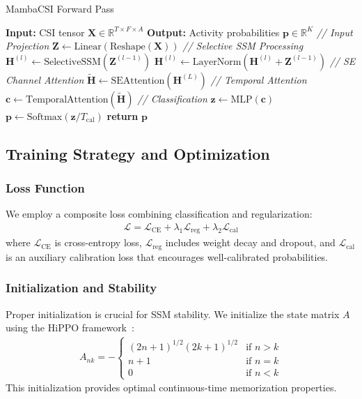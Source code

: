 \documentclass[journal]{IEEEtran}
\begin{document}
\begin{algorithm}
\caption{MambaCSI Forward Pass}
\label{alg:mambacsi}
\begin{algorithmic}[1]
\STATE \textbf{Input:} CSI tensor $\mathbf{X} \in \mathbb{R}^{T \times F \times A}$
\STATE \textbf{Output:} Activity probabilities $\mathbf{p} \in \mathbb{R}^K$
\STATE
\STATE \textit{// Input Projection}
\STATE $\mathbf{Z} \leftarrow \text{Linear}(\text{Reshape}(\mathbf{X}))$
\STATE
\STATE \textit{// Selective SSM Processing}
    \STATE $\mathbf{H}^{(l)} \leftarrow \text{SelectiveSSM}(\mathbf{Z}^{(l-1)})$
    \STATE $\mathbf{H}^{(l)} \leftarrow \text{LayerNorm}(\mathbf{H}^{(l)} + \mathbf{Z}^{(l-1)})$
\ENDFOR
\STATE
\STATE \textit{// SE Channel Attention}
\STATE $\tilde{\mathbf{H}} \leftarrow \text{SEAttention}(\mathbf{H}^{(L)})$
\STATE
\STATE \textit{// Temporal Attention}
\STATE $\mathbf{c} \leftarrow \text{TemporalAttention}(\tilde{\mathbf{H}})$
\STATE
\STATE \textit{// Classification}
\STATE $\mathbf{z} \leftarrow \text{MLP}(\mathbf{c})$
\STATE $\mathbf{p} \leftarrow \text{Softmax}(\mathbf{z} / T_{\text{cal}})$
\STATE \textbf{return} $\mathbf{p}$
\end{algorithmic}
\end{algorithm}

\subsection{Training Strategy and Optimization}

\subsubsection{Loss Function}
We employ a composite loss combining classification and regularization:
\begin{align}
\mathcal{L} = \mathcal{L}_{\text{CE}} + \lambda_1 \mathcal{L}_{\text{reg}} + \lambda_2 \mathcal{L}_{\text{cal}}
\end{align}
where $\mathcal{L}_{\text{CE}}$ is cross-entropy loss, $\mathcal{L}_{\text{reg}}$ includes weight decay and dropout, and $\mathcal{L}_{\text{cal}}$ is an auxiliary calibration loss that encourages well-calibrated probabilities.

\subsubsection{Initialization and Stability}
Proper initialization is crucial for SSM stability. We initialize the state matrix $A$ using the HiPPO framework~\cite{gu2020hippo}:
\begin{align}
A_{nk} = -\begin{cases}
(2n+1)^{1/2}(2k+1)^{1/2} & \text{if } n > k \\
n+1 & \text{if } n = k \\
0 & \text{if } n < k
\end{cases}
\end{align}
This initialization provides optimal continuous-time memorization properties.
\end{document}
